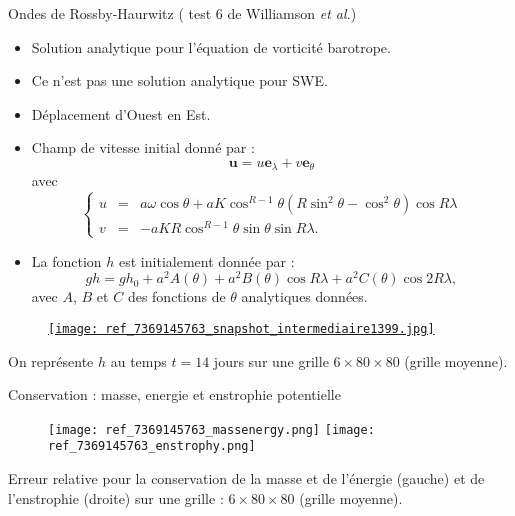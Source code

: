\documentclass[11pt]{beamer}
\begin{document}
\begin{frame}{Ondes de Rossby-Haurwitz ( test 6 de Williamson \textit{et al.})}
\begin{exampleblock}{}
\begin{itemize}
\item Solution analytique pour l'équation de vorticité barotrope.
\item Ce n'est pas une solution analytique pour SWE.
\item Déplacement d'Ouest en Est.
\item Champ de vitesse initial donné par :
$$
\mathbf{u} = u \mathbf{e}_{\lambda} + v \mathbf{e}_{\theta}
$$
avec 
$$
\left\lbrace
\begin{array}{rcl}
u & = & a \omega \cos \theta + a K \cos^{R-1} \theta \left( R \sin^2 \theta - \cos^2 \theta \right) \cos R \lambda\\
v & = & - a K R \cos^{R-1} \theta \sin \theta \sin R \lambda.
\end{array}
\right.
$$
\item La fonction $h$ est initialement donnée par :
\begin{equation}
gh = gh_0 + a^2 A(\theta) + a^2 B(\theta) \cos R \lambda + a^2 C(\theta) \cos 2 R \lambda,
\end{equation}
avec $A$, $B$ et $C$ des fonctions de $\theta$ analytiques données.
\end{itemize}
\end{exampleblock}
\end{frame}



\begin{frame}{}
\begin{figure}
\href{run:./simus/ref_7369855784.avi}{\texttt{[image: ref\_7369145763\_snapshot\_intermediaire1399.jpg]}}
\end{figure}
On représente $h$ au temps $t=14$ jours sur une grille $6 \times 80 \times 80$ (grille moyenne).
\end{frame}






\begin{frame}{Conservation : masse, energie et enstrophie potentielle}
\begin{figure}
\texttt{[image: ref\_7369145763\_massenergy.png]}
\texttt{[image: ref\_7369145763\_enstrophy.png]}
\end{figure}
Erreur relative pour la conservation de la masse et de l'énergie (gauche) et de l'enstrophie (droite) sur une grille : $6 \times 80 \times 80$ (grille moyenne). 
\end{frame}
\end{document}
